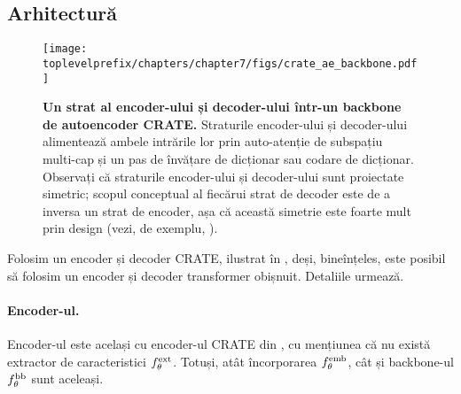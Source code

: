 \documentclass[../../book-main_ro.tex]{subfiles}
\begin{document}
\subsection{Arhitectură}\label{sub:image_completion_architecture}

\begin{figure}
    \centering 
    \texttt{[image: \\toplevelprefix/chapters/chapter7/figs/crate\_ae\_backbone.pdf]}
    \caption{\small\textbf{Un strat al encoder-ului și decoder-ului într-un backbone de autoencoder CRATE.} Straturile encoder-ului și decoder-ului alimentează ambele intrările lor prin auto-atenție de subspațiu multi-cap și un pas de învățare de dicționar sau codare de dicționar. Observați că straturile encoder-ului și decoder-ului sunt proiectate simetric; scopul conceptual al fiecărui strat de decoder este de a inversa un strat de encoder, așa că această simetrie este foarte mult prin design (vezi, de exemplu, ).}
\end{figure}

Folosim un encoder și decoder CRATE, ilustrat în , deși, bineînțeles, este posibil să folosim un encoder și decoder transformer obișnuit. Detaliile urmează.

\paragraph{Encoder-ul.} Encoder-ul este același cu encoder-ul CRATE din , cu mențiunea că nu există extractor de caracteristici \(f_{\theta}^{\mathrm{ext}}\). Totuși, atât încorporarea \(f_{\theta}^{\mathrm{emb}}\), cât și backbone-ul \(f_{\theta}^{\mathrm{bb}}\) sunt aceleași.
\end{document}
